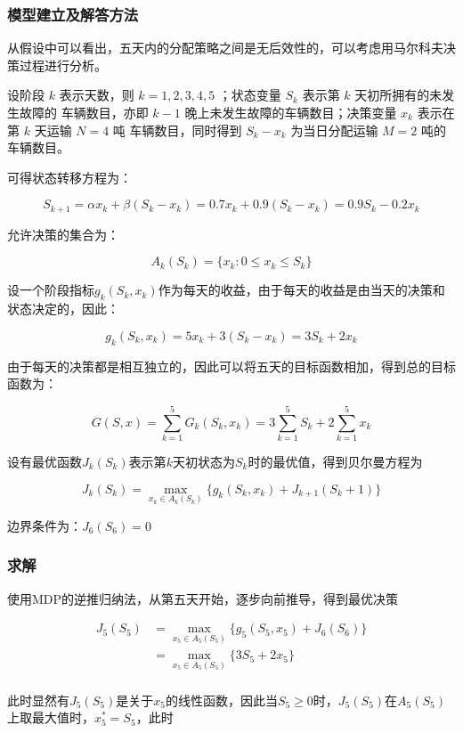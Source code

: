 \documentclass[UTF8]{ctexart}
\begin{document}
\subsubsection{模型建立及解答方法}

从假设中可以看出，五天内的分配策略之间是无后效性的，可以考虑用马尔科夫决策过程进行分析。

设阶段 $k$ 表示天数，则 $k=1,2,3,4,5$ ；状态变量 $S_k$ 表示第 $k$ 天初所拥有的未发生故障的
车辆数目，亦即 $k-1$ 晚上未发生故障的车辆数目；决策变量 $x_k$ 表示在第 $k$ 天运输 $N=4$ 吨
车辆数目，同时得到 $S_k-x_k$ 为当日分配运输 $M=2$ 吨的车辆数目。

可得状态转移方程为：

$$S_{k+1}=\alpha x_k+\beta (S_k−x_k)=0.7x_k+0.9(S_k−x_k)=0.9S_k−0.2x_k$$

允许决策的集合为：

$$A_k(S_k)=\{x_k:0\leq x_k \leq S_k\}$$

设一个阶段指标$g_k(S_k,x_k)$作为每天的收益，由于每天的收益是由当天的决策和状态决定的，因此：

$$g_k(S_k,x_k)=5x_k+3(S_k-x_k)=3S_k+2x_k$$

由于每天的决策都是相互独立的，因此可以将五天的目标函数相加，得到总的目标函数为：

$$G(S,x)=\sum_{k=1}^{5}G_k(S_k,x_k)=3\sum_{k=1}^{5}S_k+2\sum_{k=1}^{5}x_k$$

设有最优函数$J_k(S_k)$表示第$k$天初状态为$S_k$时的最优值，得到贝尔曼方程为

$$J_k(S_k)=\max_{x_k\in A_k(S_k)}\{g_k(S_k,x_k)+J_{k+1}(S_k+1)\}$$

边界条件为：$J_6(S_6)=0$

\subsubsection{求解}

使用MDP的逆推归纳法，从第五天开始，逐步向前推导，得到最优决策

\begin{equation*}
    \begin{aligned}
        J_5(S_5)&=\max_{x_5\in A_5(S_5)}\{g_5(S_5,x_5)+J_6(S_6)\}\\
                &=\max_{x_5\in A_5(S_5)}\{3S_5+2x_5\}\\
    \end{aligned}
\end{equation*}

此时显然有$J_5(S_5)$是关于$x_5$的线性函数，因此当$S_5\geq 0$时，$J_5(S_5)$在$A_5(S_5)$上取最大值时，$x_5^*=S_5$，此时
\end{document}
